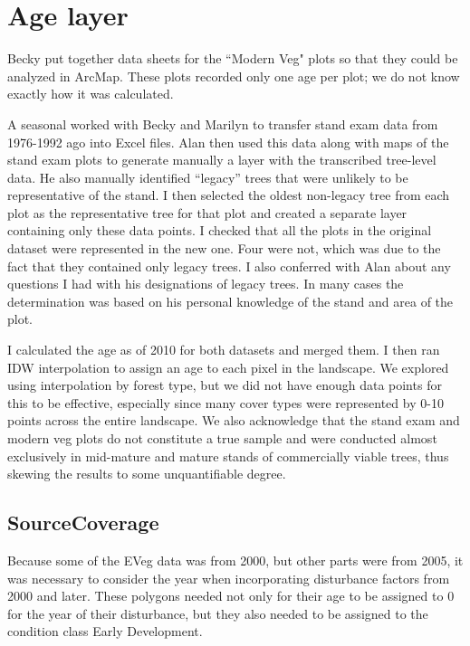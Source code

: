 \section{Age layer}
Becky put together data sheets for the ``Modern Veg" plots so that they could be analyzed in ArcMap. These plots recorded only one age per plot; we do not know exactly how it was calculated. 

A seasonal worked with Becky and Marilyn to transfer stand exam data from 1976-1992 ago into Excel files. Alan then used this data along with maps of the stand exam plots to generate manually a layer with the transcribed tree-level data. He also manually identified ``legacy'' trees that were unlikely to be representative of the stand. I then selected the oldest non-legacy tree from each plot as the representative tree for that plot and created a separate layer containing only these data points. I checked that all the plots in the original dataset were represented in the new one. Four were not, which was due to the fact that they contained only legacy trees. I also conferred with Alan about any questions I had with his designations of legacy trees. In many cases the determination was based on his personal knowledge of the stand and area of the plot.



I calculated the age as of 2010 for both datasets and merged them. I then ran IDW interpolation to assign an age to each pixel in the landscape. We explored using interpolation by forest type, but we did not have enough data points for this to be effective, especially since many cover types were represented by 0-10 points across the entire landscape. We also acknowledge that the stand exam and modern veg plots do not constitute a true sample and were conducted almost exclusively in mid-mature and mature stands of commercially viable trees, thus skewing the results to some unquantifiable degree.

\subsection{SourceCoverage} Because some of the EVeg data was from 2000, but other parts were from 2005, it was necessary to consider the year when incorporating disturbance factors from 2000 and later. These polygons needed not only for their age to be assigned to 0 for the year of their disturbance, but they also needed to be assigned to the condition class Early Development.


